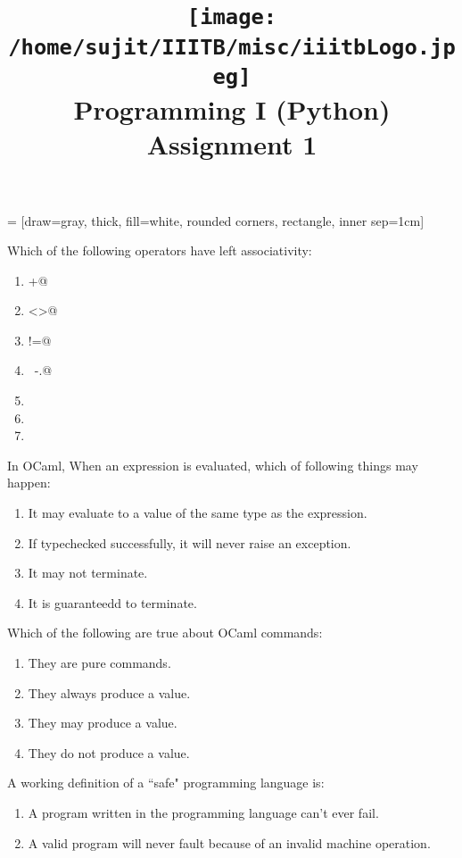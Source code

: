 \documentclass[addpoints,11pt]{exam}
\author{}
\title{\texttt{[image: /home/sujit/IIITB/misc/iiitbLogo.jpeg]} \\ Programming I (Python) \\ Assignment 1}
\date{}
\begin{document}
   = [draw=gray, thick, fill=white, rounded corners, rectangle, inner sep=1cm]
\maketitle


\thispagestyle{head}
\begin{questions}
\question Which of the following operators have left associativity:
\begin{enumerate}
\item \lstinline@+@
\item \lstinline@<>@
\item \lstinline@!=@
\item \lstinline@~-.@
\item \lstinline@mod@
\item \lstinline@lsr@
\item \lstinline@lnot@
\end{enumerate}
\question In OCaml, When an expression is evaluated, which of following things may happen:
\begin{enumerate}
\item It may evaluate to a value of the same type as the expression.
\item If typechecked successfully, it will never raise an exception.
\item It may not terminate.
\item It is guaranteedd to terminate.
\end{enumerate}
\question Which of the following are true about OCaml commands:
\begin{enumerate}
\item They are pure commands.
\item They always produce a value.
\item They may produce a value.
\item They do not produce a value.
\end{enumerate}\question A working definition of a ``safe" programming language is:
\begin{enumerate}
\item A program written in the programming language can't ever fail.
\item A valid program will never fault because of an invalid machine operation.

\end{enumerate}
\end{questions}
\end{document}
